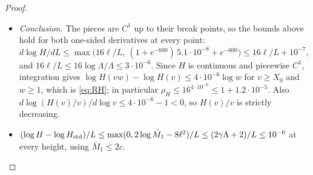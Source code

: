 \begin{proof}
\begin{itemize}
\begin{itemize}
    $\kappa=\tfrac12+\tfrac12A'(\tfrac1A+\tfrac1{A+1})+\tfrac12A'/(\Lambda_s-A-1)$ with $A'=2-1/\ell_s$, so
    $\kappa\le\tfrac12+2/A_s+10^{-7}\le0.63$, as $A_s\ge16.2$. Also $A_s\le2\ell_s-20.6$, so
    $A_s(A_s+1)/\ell_s^2\le(2-19.6/42.82)^2\le2.38$. The contribution is at most
    $2\cdot0.63\cdot1.7\cdot2.38\cdot10^{-8}\le5.1\cdot10^{-8}$.
  \item If $s<-\log10^8$, then $\Lambda_s=e^{-s}=e^{\ell_s}$ and $A_s=\log2+\ell_s-\log\ell_s$, so $A_s+1\le\ell_s$. The
    variation of $\Lambda_s$ adds at most $\tfrac12(1+10^{-6})$ to the logarithmic rate, while the $A$-terms are now
    non-positive, so $\kappa\le1+10^{-6}$. The contribution is at most $2(1+10^{-6})\cdot1.7\cdot e^{-\ell_s}\le3.5\cdot10^{-8}$.
  \end{itemize}
  So $2\Lambda\gamma_*'(s)/L\le5.1\cdot10^{-8}$ for $s\le s_H$.
\item \emph{Conclusion.} The pieces are $C^1$ up to their break points, so the bounds above hold for both one-sided
  derivatives at every point:
  $d\log H/dL\le\max\big(16\ell/L,\ (1+e^{-600})\,5.1\cdot10^{-8}+e^{-600}\big)\le16\ell/L+10^{-7}$, and
  $16\ell/L\le16\log\Lambda/\Lambda\le3\cdot10^{-6}$. Since $H$ is continuous and piecewise $C^1$, integration gives
  $\log H(vw)-\log H(v)\le4\cdot10^{-6}\log w$ for $v\ge X_0$ and $w\ge1$, which is \eqref{eq:RH}; in particular
  $\rho_H\le16^{4\cdot10^{-6}}\le1+1.2\cdot10^{-5}$. Also $d\log(H(v)/v)/d\log v\le4\cdot10^{-6}-1<0$, so $H(v)/v$ is
  strictly decreasing.
\item $(\log H-\log H_{\mathrm{std}})/L\le\max(0,2\log\bar M_1-8\ell^2)/L\le(2\gamma\Lambda+2)/L\le10^{-6}$ at every height, using
  $\bar M_1\le2c$. \qedhere
\end{itemize}
\end{proof}

